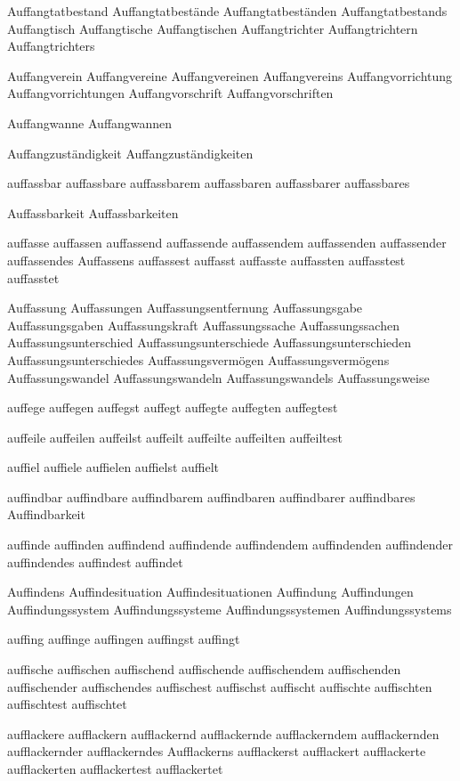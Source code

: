 Auffangtatbestand
Auffangtatbestände
Auffangtatbeständen
Auffangtatbestands
Auffangtisch
Auffangtische
Auffangtischen
Auffangtrichter
Auffangtrichtern
Auffangtrichters

Auffangverein
Auffangvereine
Auffangvereinen
Auffangvereins
Auffangvorrichtung
Auffangvorrichtungen
Auffangvorschrift
Auffangvorschriften

Auffangwanne
Auffangwannen

Auffangzuständigkeit
Auffangzuständigkeiten

auffassbar
auffassbare
auffassbarem
auffassbaren
auffassbarer
auffassbares

Auffassbarkeit
Auffassbarkeiten 

auffasse
auffassen
auffassend
auffassende
auffassendem
auffassenden
auffassender
auffassendes
Auffassens
auffassest
auffasst
auffasste
auffassten
auffasstest
auffasstet

Auffassung
Auffassungen
Auffassungsentfernung
Auffassungsgabe
Auffassungsgaben
Auffassungskraft
Auffassungssache
Auffassungssachen
Auffassungsunterschied
Auffassungsunterschiede
Auffassungsunterschieden
Auffassungsunterschiedes
Auffassungsvermögen
Auffassungsvermögens
Auffassungswandel
Auffassungswandeln
Auffassungswandels
Auffassungsweise

auffege
auffegen
auffegst
auffegt
auffegte
auffegten
auffegtest

auffeile
auffeilen
auffeilst
auffeilt
auffeilte
auffeilten
auffeiltest

auffiel
auffiele
auffielen
auffielst
auffielt

auffindbar
auffindbare
auffindbarem
auffindbaren
auffindbarer
auffindbares
Auffindbarkeit

auffinde
auffinden
auffindend
auffindende
auffindendem
auffindenden
auffindender
auffindendes
auffindest
auffindet

Auffindens
Auffindesituation
Auffindesituationen
Auffindung
Auffindungen
Auffindungssystem
Auffindungssysteme
Auffindungssystemen
Auffindungssystems

auffing
auffinge
auffingen
auffingst
auffingt

auffische
auffischen
auffischend
auffischende
auffischendem
auffischenden
auffischender
auffischendes
auffischest
auffischst
auffischt
auffischte
auffischten
auffischtest
auffischtet

aufflackere
aufflackern
aufflackernd
aufflackernde
aufflackerndem
aufflackernden
aufflackernder
aufflackerndes
Aufflackerns
aufflackerst
aufflackert
aufflackerte
aufflackerten
aufflackertest
aufflackertet

